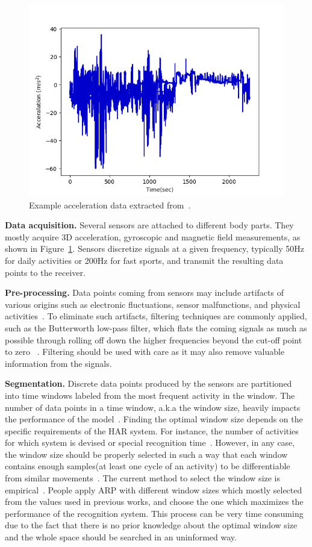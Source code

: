 \documentclass[sensors,article,submit,moreauthors,pdftex]{Definitions/mdpi}
\begin{document}
\begin{figure}[ht]
    \centering
    \includegraphics[width=.4\textwidth]{Figures/signal.png}
    \caption{Example acceleration data extracted from~\cite{banos2012benchmark}.}
    \label{fig:signal}
\end{figure}
\noindent\textbf{Data acquisition.} Several sensors are attached to different body parts. They mostly acquire 3D acceleration, gyroscopic and magnetic field measurements, as shown in Figure~\ref{fig:signal}. Sensors discretize signals at a given frequency, typically 50Hz for 
daily activities or 200Hz for fast sports, and transmit the resulting data points to 
the receiver. 

\noindent\textbf{Pre-processing.} Data points coming from sensors may
include artifacts of various origins such as 
electronic fluctuations, sensor malfunctions, and physical activities~\cite{arlot2010survey}. To eliminate such artifacts, filtering techniques are commonly applied, such as the Butterworth low-pass filter, which flats the coming signals as much as possible through rolling off down the higher frequencies beyond the cut-off point to zero ~\cite{morris2014recofit,selles2005automated,najafi2003ambulatory}. 
Filtering should be used with care as it may also remove valuable information from the signals.


\noindent\textbf{Segmentation.}
Discrete data points produced by the sensors are partitioned into time 
windows labeled from the most frequent activity in the window. The number of data 
points in a time window, a.k.a the window size, heavily impacts the 
performance of the model~\cite{bulling2014tutorial,banos2014window}. Finding the optimal window size depends on the specific requirements of the HAR system. For instance, the number of activities for which system is devised or special recognition time~\cite{banos2014window}. However, in any case, the window size should be properly selected in such a way that each window contains enough samples(at least one cycle of an activity) to be differentiable from similar movements~\cite{janidarmian2017comprehensive}. The current method 
to select the window size is empirical~\cite{bulling2014tutorial}. People apply ARP with different window sizes which mostly selected from the values used in previous works, and choose the one which maximizes the performance of the recognition system. This process can be very time consuming due to the fact that there is no prior knowledge about the optimal window size and the whole space should be searched in an uninformed way.  
\end{document}
